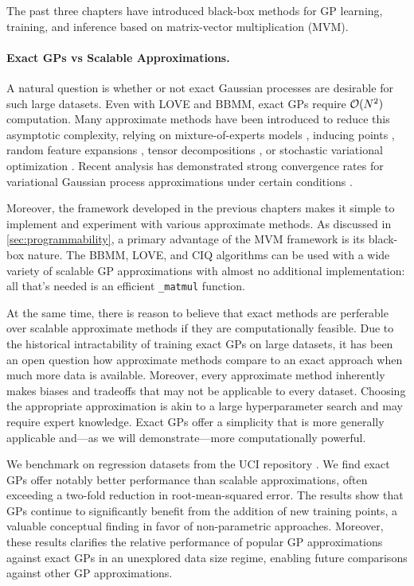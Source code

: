 The past three chapters have introduced black-box methods for GP learning, training, and inference based on matrix-vector multiplication (MVM).

\paragraph{Exact GPs vs Scalable Approximations.}
A natural question is whether or not exact Gaussian processes are desirable for such large datasets.
Even with LOVE and BBMM, exact GPs require $\bigo{N^2}$ computation.
Many approximate methods have been introduced to reduce this asymptotic complexity, relying on mixture-of-experts models \cite{deisenroth2015distributed}, inducing points \citep{snelson2006sparse,titsias2009variational,wilson2015kernel,gardner2018product},
random feature expansions \cite{rahimi2008random,le2013fastfood,yang2015carte},
tensor decompositions \cite{izmailov2018scalable,evans2018scalable},
or stochastic variational optimization \citep{hensman2013gaussian,hensman2015scalable,wilson2016stochastic,cheng2017variational,salimbeni2018orthogonally,shi2019sparse}.
Recent analysis has demonstrated strong convergence rates for variational Gaussian process approximations under certain conditions \cite{burt2019rates}.

Moreover, the framework developed in the previous chapters makes it simple to implement and experiment with various approximate methods.
As discussed in \cref{sec:programmability}, a primary advantage of the MVM framework is its black-box nature.
The BBMM, LOVE, and CIQ algorithms can be used with a wide variety of scalable GP approximations with almost no additional implementation: all that's needed is an efficient {\tt \_matmul} function.

At the same time, there is reason to believe that exact methods are perferable over scalable approximate methods if they are computationally feasible.
Due to the historical intractability of training exact GPs on large datasets, it has been an open question how approximate methods compare to an exact approach when much more data is available.
Moreover, every approximate method inherently makes biases and tradeoffs \cite{turner2011two,bauer2016understanding} that may not be applicable to every dataset.
Choosing the appropriate approximation is akin to a large hyperparameter search and may require expert knowledge.
Exact GPs offer a simplicity that is more generally applicable and---as we will demonstrate---more computationally powerful.

We benchmark on regression datasets from the UCI repository \citep{asuncion2007uci}.
We find exact GPs offer notably better performance than scalable approximations, often exceeding a two-fold reduction in root-mean-squared error.
The results show that GPs continue to significantly benefit from the addition of new training points, a valuable conceptual finding in favor of non-parametric approaches.
Moreover, these results clarifies the relative performance of popular GP approximations against exact GPs in an unexplored data size regime, enabling future comparisons against other GP approximations.

